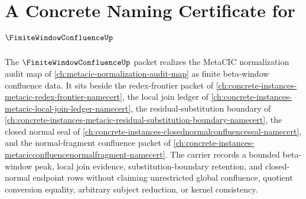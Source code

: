 \chapter{A Concrete Naming Certificate for $\FiniteWindowConfluenceUp$}
\label{ch:concrete-instances-finite-window-confluence-namecert}

The $\FiniteWindowConfluenceUp$ packet realizes the MetaCIC normalization audit map of \autoref{ch:metacic-normalization-audit-map} as finite beta-window confluence data. It sits beside the redex-frontier packet of \autoref{ch:concrete-instances-metacic-redex-frontier-namecert}, the local join ledger of \autoref{ch:concrete-instances-metacic-local-join-ledger-namecert}, the residual-substitution boundary of \autoref{ch:concrete-instances-metacic-residual-substitution-boundary-namecert}, the closed normal seal of \autoref{ch:concrete-instances-closednormalconfluenceseal-namecert}, and the normal-fragment confluence packet of \autoref{ch:concrete-instances-metacicconfluencenormalfragment-namecert}. The carrier records a bounded beta-window peak, local join evidence, substitution-boundary retention, and closed-normal endpoint rows without claiming unrestricted global confluence, quotient conversion equality, arbitrary subject reduction, or kernel consistency.



